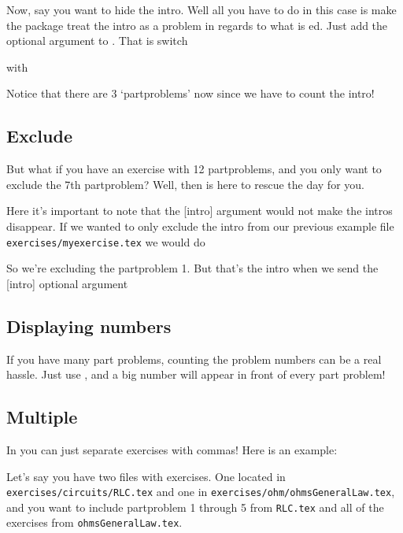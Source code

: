 Now, say you want to hide the intro. Well all you have to do in this case is
make the package treat the intro as a problem in regards to what is ed.
Just add the optional argument  to . That is switch
\begin{dispListing}
\end{dispListing}
with
\begin{dispListing}
\end{dispListing}
Notice that there are 3 `partproblems' now since we have to count the intro!

\subsection{Exclude}
But what if you have an exercise with 12 partproblems, and you only want to exclude the 7th partproblem? Well, then  is here to rescue the day for you.
\begin{dispListing}
\end{dispListing}
Here it's important to note that the [intro] argument would not make the intros disappear. If we wanted to only exclude the intro from our previous example file \texttt{exercises/myexercise.tex} we would do
\begin{dispListing}
\end{dispListing}
So we're excluding the partproblem 1. But that's the intro when we send the [intro] optional argument

\subsection{Displaying numbers}
If you have many part problems, counting the problem numbers can be a real hassle. Just use , and a big number will appear in front of every part problem!

\subsection{Multiple}
In  you can just separate exercises with commas! Here is an example:

Let's say you have two files with exercises. One located in \texttt{exercises/circuits/RLC.tex} and one in \texttt{exercises/ohm/ohmsGeneralLaw.tex}, and you want to include partproblem 1 through 5 from \texttt{RLC.tex} and all of the exercises from \texttt{ohmsGeneralLaw.tex}.

